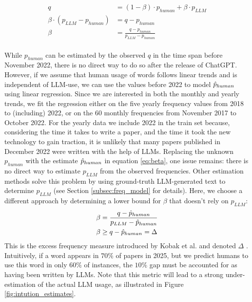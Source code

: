 \begin{equation}\label{eq:beta}
\begin{split}
    q &= (1-\beta) \cdot p_{human} + \beta \cdot p_{LLM}\\
    \beta \cdot (p_{LLM}-p_{human}) &= q -  p_{human}\\
    \beta &= \frac{q -  p_{human}}{p_{LLM}-p_{human}}
\end{split}
\end{equation}
\\
While $p_{human}$ can be estimated by the observed $q$ in the time span before November 2022, there is no direct way to do so after the release of ChatGPT.
However, if we assume that human usage of words follows linear trends and is independent of LLM-use, we can use the values before 2022 to model $\hat{p}_{human}$ using linear regression.
Since we are interested in both the monthly and yearly trends, we fit the regression either on the five yearly frequency values from 2018 to (including) 2022, or on the 60 monthly frequencies from November 2017 to October 2022.
For the yearly data we include 2022 in the train set because, considering the time it takes to write a paper, and the time it took the new technology to gain traction, it is unlikely that many papers published in December 2022 were written with the help of LLMs.
Replacing the unknown $p_{human}$ with the estimate $\hat{p}_{human}$ in equation \ref{eq:beta}, one issue remains: there is no direct way to estimate $p_{LLM}$ from the observed frequencies.
Other estimation methods solve this problem by using ground-truth LLM-generated text to determine $p_{LLM}$ (see Section \ref{subsec:freq_model} for details).
Here, we choose a different approach by determining a lower bound for $\beta$ that doesn't rely on $p_{LLM}$:
\begin{equation}\label{eq:delta}
    \begin{split}
        \beta &= \frac{q -  \hat{p}_{human}}{p_{LLM}-\hat{p}_{human}}\\
        \beta &\ge q - \hat{p}_{human} =\Delta
    \end{split}
\end{equation}
This is the excess frequency measure introduced by Kobak et al. and denoted $\Delta$ \cite{Kobak2025}.
Intuitively, if a word appears in $70\%$ of papers in 2025, but we predict humans to use this word in only $60\%$ of instances, the $10\%$ gap must be accounted for as having been written by LLMs. 
Note that this metric will lead to a strong under-estimation of the actual LLM usage, as illustrated in Figure \ref{fig:intution_estimates}.
